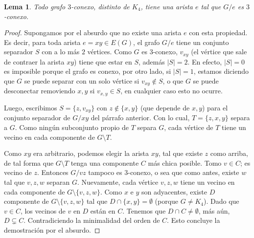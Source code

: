 \documentclass[12pt]{report}
\theoremstyle{plain}
\newtheorem{lemma}[theorem]{Lema}
\theoremstyle{definition}
\newcommand{\abs}[1]{\left \vert #1 \right \vert}
\begin{document}
\begin{lemma}\label{lema:todo grafo 3-conexo distinto de K_4 tiene una arista e tal que G/e es nuevamente 3-conexo}
Todo grafo $3$-conexo, distinto de $K_4$, tiene una arista $e$ tal que $G/e$ es $3$-conexo.
\end{lemma}
\begin{proof}
Supongamos por el absurdo que no existe una arista $e$ con esta propiedad. Es decir, para toda arista $e = xy \in E(G)$, el grafo $G/e$ tiene un conjunto separador $S$ con a lo más $2$ vértices. Como $G$ es $3$-conexo, $v_{xy}$ (el vértice que sale de contraer la arista $xy$) tiene que estar en $S$, además $\abs S = 2$. En efecto, $\abs S = 0$ es imposible porque el grafo es conexo, por otro lado, si $\abs S = 1$, estamos diciendo que $G$ se puede separar con un solo vértice si $v_{xy} \not \in S$, o que $G$ se puede desconectar removiendo $x,y$ si $v_{x,y} \in S$, en cualquier caso esto no ocurre.

Luego, escribimos $S = \{z, v_{xy}\}$ con $z \not \in \{x,y\}$ (que depende de $x,y$) para el conjunto separador de $G/xy$ del párrafo anterior. Con lo cual, $T=\{z,x,y\}$ separa a $G$. Como ningún subconjunto propio de $T$ separa $G$, cada vértice de $T$ tiene un vecino en cada componente de $G \setminus T$.

Como $xy$ era arbitrario, podemos elegir la arista $xy$, tal que existe $z$ como arriba, de tal forma que $G \setminus T$ tenga una componente $C$ más chica posible. Tomo $v \in C$; es vecino de $z$. Entonces $G/v z$ tampoco es $3$-conexo, o sea que como antes, existe $w$ tal que $v,z,w$ separan $G$. Nuevamente, cada vértice $v,z,w$ tiene un vecino en cada componente de $G \setminus \{v,z,w\}$. Como $x$ e $y$ son adyacentes, existe $D$ componente de $G \setminus \{v,z,w\}$ tal que $D \cap \{x,y\} = \emptyset$ (porque $G \neq K_4$). Dado que $v \in C$, los vecinos de $v$ en $D$ están en $C$. Tenemos que $D \cap C \neq \emptyset$, más aún, $D \subsetneq C$. Contradiciendo la minimalidad del orden de $C$. Esto concluye la demostración por el absurdo.
\end{proof}
\end{document}

